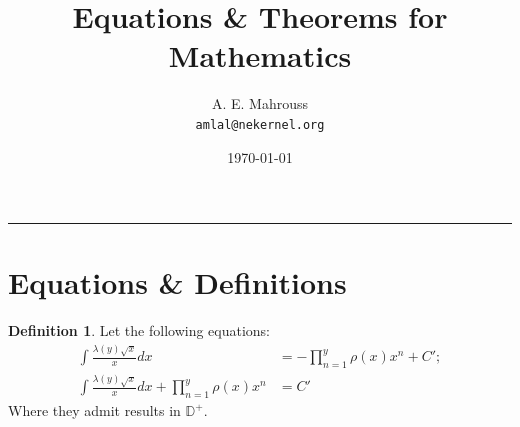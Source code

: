 \documentclass[10pt]{article}
\title{%
  \vspace{-1.5em}%
  \large\textbf{Equations \& Theorems for Mathematics}%
}
\author{A. E. Mahrouss\\\texttt{amlal@nekernel.org}}
\date{\today}
\theoremstyle{plain}
\theoremstyle{definition}
\newtheorem{definition}[theorem]{Definition}
\theoremstyle{remark}
\begin{document}
  \maketitle
\vspace{-0.5em}
\vspace{0.8em}
\rule{\linewidth}{0.4pt}
\vspace{1em}

\section{Equations \& Definitions}

\begin{definition}
	Let the following equations:
	\begin{align*}
		\int \frac{\lambda(y) \sqrt{x}}{x} dx &= - \prod_{n=1}^{y}\rho(x) x^{n} + C';\\
		\int \frac{\lambda(y) \sqrt{x}}{x} dx + \prod_{n=1}^{y}\rho(x) x^{n} &= C'
	\end{align*}
	Where they admit results in $\mathbb{D}^{+}$.
\end{definition}

\nocite{*}



\end{document}
